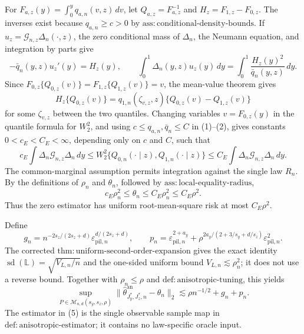 For \(F_{a,z}(y)=\int_0^yq_{a,n}(v,z)\,dv\), let \(Q_{a,z}=F_{a,z}^{-1}\) and \(H_z=F_{1,z}-F_{0,z}\).  The inverses exist because \(q_{a,n}\ge c>0\) by \(\mathrm{ass{:}conditional\text{-}density\text{-}bounds}\).  If \(u_z=\mathcal G_{n,z}\Delta_n(\cdot,z)\), the zero conditional mass of \(\Delta_n\), the Neumann equation, and integration by parts give
\[
-\bar q_n(y,z)u_z'(y)=H_z(y),
\qquad
\int_0^1\Delta_n(y,z)u_z(y)\,dy
=\int_0^1\frac{H_z(y)^2}{\bar q_n(y,z)}\,dy.                                   \tag{1}
\]
Since \(F_{0,z}\{Q_{0,z}(v)\}=F_{1,z}\{Q_{1,z}(v)\}=v\), the mean-value theorem gives
\[
H_z\{Q_{0,z}(v)\}
=q_{1,n}(\zeta_{v,z},z)\{Q_{0,z}(v)-Q_{1,z}(v)\}                               \tag{2}
\]
for some \(\zeta_{v,z}\) between the two quantiles.  Changing variables \(v=F_{0,z}(y)\) in the quantile formula for \(W_2^2\), and using \(c\le q_{a,n},\bar q_n\le C\) in (1)--(2), gives constants \(0<c_E<C_E<\infty\), depending only on \(c\) and \(C\), such that
\[
c_E\int\Delta_n\mathcal G_{n,z}\Delta_n\,dy
\le W_2^2\{Q_{0,n}(\cdot\mid z),Q_{1,n}(\cdot\mid z)\}
\le C_E\int\Delta_n\mathcal G_{n,z}\Delta_n\,dy.                             \tag{3}
\]
The common-marginal assumption permits integration against the single law \(R_n\).  By the definitions of \(\rho_n\) and \(\theta_n\), followed by \(\mathrm{ass{:}local\text{-}equality\text{-}radius}\),
\[
c_E\rho_n^2\le\theta_n\le C_E\rho_n^2\le C_E\rho^2.                          \tag{4}
\]
Thus the zero estimator has uniform root-mean-square risk at most \(C_E\rho^2\).

Define
\[
g_n=n^{-2s_z/(2s_z+d)}\varepsilon_{\mathrm{pil},n}^{d/(2s_z+d)},
\qquad
p_n=\varepsilon_{\mathrm{pil},n}^{2+a_y}
+\rho^{2a_y/(2+3/s_y+d/s_z)}\varepsilon_{\mathrm{pil},n}^2.
\]
The corrected \(\mathrm{thm{:}uniform\text{-}second\text{-}order\text{-}expansion}\) gives the exact identity \(\operatorname{sd}(\mathbb L)=\sqrt{V_{L,n}/n}\) and the one-sided uniform bound \(V_{L,n}\lesssim\rho_n^2\); it does not use a reverse bound.  Together with \(\rho_n\le\rho\) and \(\mathrm{def{:}anisotropic\text{-}tuning}\), this yields
\[
\sup_{P\in\mathcal M_{n,d}(s_y,s_z,\rho)}
\|\widehat\theta^{\mathrm{an}}_{J_y^*,J_z^*,n}-\theta_n\|_2
\lesssim\rho n^{-1/2}+g_n+p_n.                                                  \tag{5}
\]
The estimator in (5) is the single observable sample map in \(\mathrm{def{:}anisotropic\text{-}estimator}\); it contains no law-specific oracle input.

